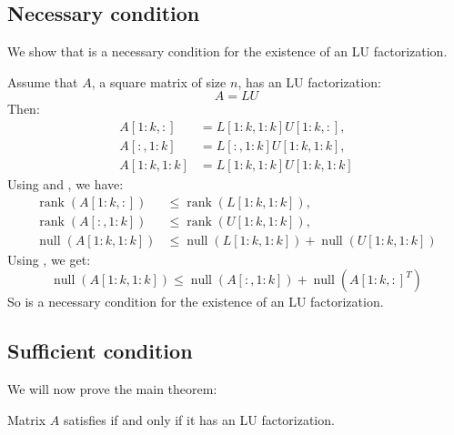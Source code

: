 \documentclass[10pt,twoside]{siamart1116}
\DeclareMathOperator{\rk}{rank}
\DeclareMathOperator{\nl}{null}
\numberwithin{theorem}{section}
\begin{document}
\subsection{Necessary condition}

We show that  is a necessary condition for the existence of an LU factorization.

Assume that $A$, a square matrix of size $n$, has an LU factorization:
\[ A = LU \]
Then:
\begin{align*}
	A[1:k,:]   & = L[1:k,1:k] U[1:k,:], \\
	A[:,1:k]   & = L[:,1:k] U[1:k,1:k], \\
	A[1:k,1:k] & = L[1:k,1:k] U[1:k,1:k]
\end{align*}
Using  and , we have:
\begin{align*}
	\rk(A[1:k,:])   & \le \rk(L[1:k,1:k]), \\
	\rk(A[:,1:k])   & \le \rk(U[1:k,1:k]), \\
	\nl(A[1:k,1:k]) & \le \nl(L[1:k,1:k]) + \nl(U[1:k,1:k])
\end{align*}
Using , we get:
\[
	\nl(A[1:k,1:k]) \le \nl(A[:,1:k]) + \nl({A[1:k,:]}^T)
\]
So  is a necessary condition for the existence of an LU factorization.

\subsection{Sufficient condition}

We will now prove the main theorem:
\begin{theorem}\label{thm:main}
	Matrix $A$ satisfies  if and only if it has an LU factorization.
\end{theorem}
\end{document}
